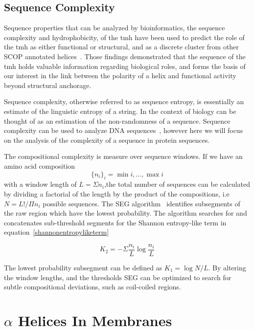 \subsection{Sequence Complexity}

Sequence properties that can be analyzed by bioinformatics, the sequence complexity and hydrophobicity, of the \gls{tmh} have been used to predict the role of the \gls{tmh} as either functional or structural, and as a discrete cluster from other SCOP annotated helices~\cite{Wong2012}. Those findings demonstrated that the sequence of the \gls{tmh} holds valuable information regarding biological roles, and forms the basis of our interest in the link between the polarity of a helix and functional activity beyond structural anchorage.

Sequence complexity, otherwise referred to as sequence entropy, is essentially an estimate of the linguistic entropy of a string. In the context of biology can be thought of as an estimation of the non-randomness of a sequence. Sequence complexity can be used to analyze DNA sequences~\cite{Pinho2013, Oliver1993, Troyanskaya2002}, however here we will focus on the analysis of the complexity of a sequence in protein sequences.

The compositional complexity is measure over sequence windows. If we have an amino acid composition $$\{{{n}_{i}}{\}}_{i}={\min{i}},\ldots,{\max{i}}$$ with a window length of $L=\Sigma {n}_i $,the total number of sequences can be calculated by dividing a factorial of the length by the product of the compositions, i.e\  $ N = L!/\Pi{n}_i $ possible sequences. The SEG algorithm~\cite{WOOTTON1994269, Wootton1996} identifies subsegments of the raw region which have the lowest probability. The algorithm searches for and concatenates sub-threshold segments for the Shannon entropy-like term in equation~\ref{shannonentropyliketerm}

\begin{equation} \label{shannonentropyliketerm}
{K}_{2}=-\Sigma\frac{n_i}{L}\log\frac{n_i}{L}
\end{equation}

The lowest probability subsegment can be defined as $ K_1=\log N/L $. By altering the window lengths, and the thresholds SEG can be optimized to search for subtle compositional deviations, such as coil-coiled regions.


\section{$\alpha$ Helices In Membranes }

